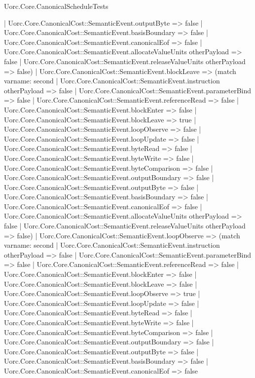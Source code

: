 \begin{lexlean}{Uorc.Core.CanonicalScheduleTests}
\begin{semanticmodule}
{      | Uorc.Core.CanonicalCost::SemanticEvent.outputByte => false
      | Uorc.Core.CanonicalCost::SemanticEvent.basisBoundary => false
      | Uorc.Core.CanonicalCost::SemanticEvent.canonicalEof => false
      | Uorc.Core.CanonicalCost::SemanticEvent.allocateValueUnits otherPayload => false
      | Uorc.Core.CanonicalCost::SemanticEvent.releaseValueUnits otherPayload => false)
    | Uorc.Core.CanonicalCost::SemanticEvent.blockLeave => (match var{name: second}
      | Uorc.Core.CanonicalCost::SemanticEvent.instruction otherPayload => false
      | Uorc.Core.CanonicalCost::SemanticEvent.parameterBind => false
      | Uorc.Core.CanonicalCost::SemanticEvent.referenceRead => false
      | Uorc.Core.CanonicalCost::SemanticEvent.blockEnter => false
      | Uorc.Core.CanonicalCost::SemanticEvent.blockLeave => true
      | Uorc.Core.CanonicalCost::SemanticEvent.loopObserve => false
      | Uorc.Core.CanonicalCost::SemanticEvent.loopUpdate => false
      | Uorc.Core.CanonicalCost::SemanticEvent.byteRead => false
      | Uorc.Core.CanonicalCost::SemanticEvent.byteWrite => false
      | Uorc.Core.CanonicalCost::SemanticEvent.byteComparison => false
      | Uorc.Core.CanonicalCost::SemanticEvent.outputBoundary => false
      | Uorc.Core.CanonicalCost::SemanticEvent.outputByte => false
      | Uorc.Core.CanonicalCost::SemanticEvent.basisBoundary => false
      | Uorc.Core.CanonicalCost::SemanticEvent.canonicalEof => false
      | Uorc.Core.CanonicalCost::SemanticEvent.allocateValueUnits otherPayload => false
      | Uorc.Core.CanonicalCost::SemanticEvent.releaseValueUnits otherPayload => false)
    | Uorc.Core.CanonicalCost::SemanticEvent.loopObserve => (match var{name: second}
      | Uorc.Core.CanonicalCost::SemanticEvent.instruction otherPayload => false
      | Uorc.Core.CanonicalCost::SemanticEvent.parameterBind => false
      | Uorc.Core.CanonicalCost::SemanticEvent.referenceRead => false
      | Uorc.Core.CanonicalCost::SemanticEvent.blockEnter => false
      | Uorc.Core.CanonicalCost::SemanticEvent.blockLeave => false
      | Uorc.Core.CanonicalCost::SemanticEvent.loopObserve => true
      | Uorc.Core.CanonicalCost::SemanticEvent.loopUpdate => false
      | Uorc.Core.CanonicalCost::SemanticEvent.byteRead => false
      | Uorc.Core.CanonicalCost::SemanticEvent.byteWrite => false
      | Uorc.Core.CanonicalCost::SemanticEvent.byteComparison => false
      | Uorc.Core.CanonicalCost::SemanticEvent.outputBoundary => false
      | Uorc.Core.CanonicalCost::SemanticEvent.outputByte => false
      | Uorc.Core.CanonicalCost::SemanticEvent.basisBoundary => false
      | Uorc.Core.CanonicalCost::SemanticEvent.canonicalEof => false
}
\end{semanticmodule}
\end{lexlean}
